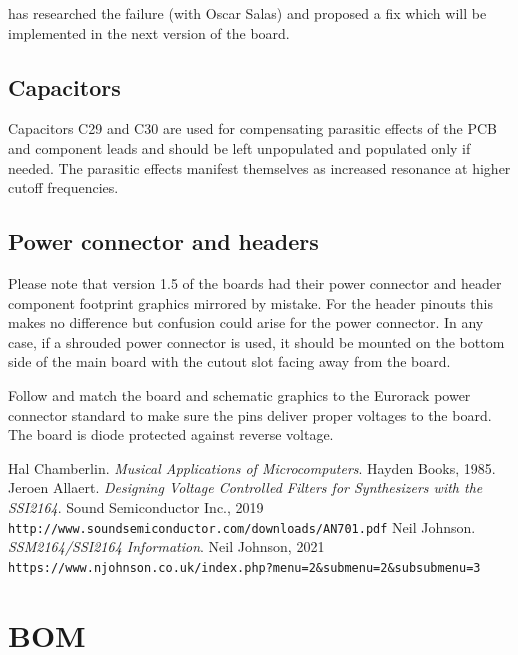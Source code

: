 \documentclass{article}
\begin{document}
\cite{johnson} has researched the failure (with Oscar Salas) and proposed a fix which will be implemented in the next version of the board.

\subsection{Capacitors}
Capacitors C29 and C30 are used for compensating parasitic effects of the PCB and component leads and should be left unpopulated and populated only if needed. The parasitic effects manifest themselves as increased resonance at higher cutoff frequencies.

\subsection{Power connector and headers}
Please note that version 1.5 of the boards had their power connector and header component footprint graphics mirrored by mistake. For the header pinouts this makes no difference but confusion could arise for the power connector. In any case, if a shrouded power connector is used, it should be mounted on the bottom side of the main board with the cutout slot facing away from the board.\newline

Follow and match the board and schematic graphics to the Eurorack power connector standard to make sure the pins deliver proper voltages to the board. The board is diode protected against reverse voltage.

\begin{thebibliography}{9}
Hal Chamberlin.
\textit{Musical Applications of Microcomputers}.
Hayden Books, 1985.
Jeroen Allaert.
\textit{Designing Voltage Controlled Filters for Synthesizers with the SSI2164}.
Sound Semiconductor Inc., 2019
\\\texttt{http://www.soundsemiconductor.com/downloads/AN701.pdf}
Neil Johnson.
\textit{SSM2164/SSI2164 Information}.
Neil Johnson, 2021
\\\texttt{https://www.njohnson.co.uk/index.php?menu=2\&submenu=2\&subsubmenu=3}
\end{thebibliography}

\newpage

\appendix

\section{BOM}
\end{document}

